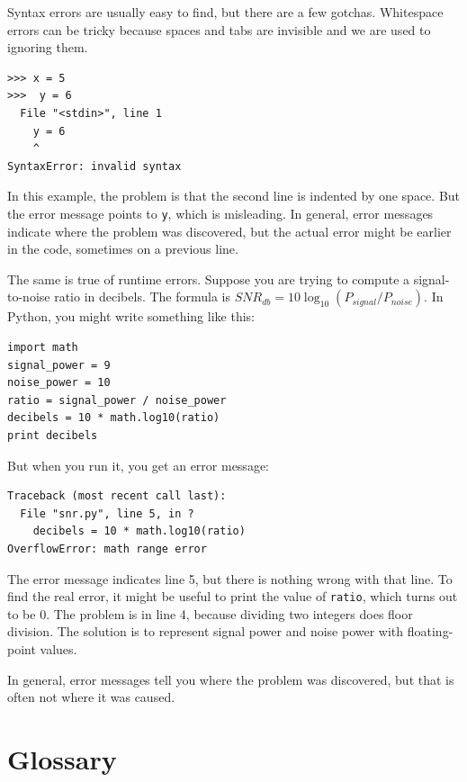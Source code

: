 \documentclass[10pt]{book}
\begin{document}
Syntax errors are usually easy to find, but there are a few
gotchas.  Whitespace errors can be tricky because spaces and
tabs are invisible and we are used to ignoring them.


\beforeverb
\begin{verbatim}
>>> x = 5
>>>  y = 6
  File "<stdin>", line 1
    y = 6
    ^
SyntaxError: invalid syntax
\end{verbatim}
\afterverb
%
In this example, the problem is that the second line is indented by
one space.  But the error message points to {\tt y}, which is
misleading.  In general, error messages indicate where the problem was
discovered, but the actual error might be earlier in the code,
sometimes on a previous line.


The same is true of runtime errors.  Suppose you are trying
to compute a signal-to-noise ratio in decibels.  The formula
is $SNR_{db} = 10 \log_{10} (P_{signal} / P_{noise})$.  In Python,
you might write something like this:

\beforeverb
\begin{verbatim}
import math
signal_power = 9
noise_power = 10
ratio = signal_power / noise_power
decibels = 10 * math.log10(ratio)
print decibels
\end{verbatim}
\afterverb
%
But when you run it, you get an error message:


\beforeverb
\begin{verbatim}
Traceback (most recent call last):
  File "snr.py", line 5, in ?
    decibels = 10 * math.log10(ratio)
OverflowError: math range error
\end{verbatim}
\afterverb
%
The error message indicates line 5, but there is nothing
wrong with that line.  To find the real error, it might be
useful to print the value of {\tt ratio}, which turns out to
be 0.  The problem is in line 4, because dividing two integers
does floor division.  The solution is to represent signal power
and noise power with floating-point values.


In general, error messages tell you where the problem was discovered, 
but that is often not where it was caused.


\section{Glossary}
\end{document}
